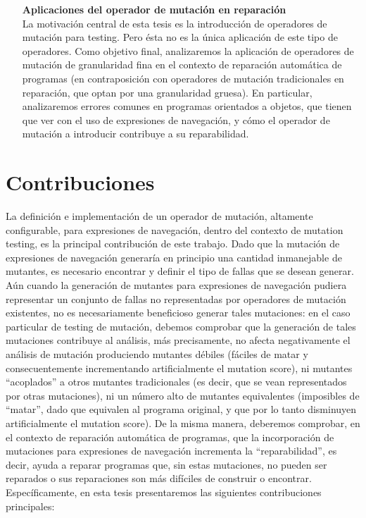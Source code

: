 \begin{enumerate}[leftmargin=.75cm,align=left,style=nextline]
    \item[\textbf{Aplicaciones del operador de mutaci\'on en reparaci\'on}]\mbox{}\\
	La motivaci\'on central de esta tesis es la introducci\'on de operadores de mutaci\'on para testing. Pero \'esta no es la \'unica aplicaci\'on de este tipo de operadores. Como objetivo final, analizaremos la aplicaci\'on de operadores de mutaci\'on de granularidad fina en el contexto de reparaci\'on autom\'atica de programas (en contraposici\'on con operadores de mutaci\'on tradicionales en reparaci\'on, que optan por una granularidad gruesa). En particular, analizaremos errores comunes en programas orientados a objetos, que tienen que ver con el uso de expresiones de navegaci\'on, y c\'omo el operador de mutaci\'on a introducir contribuye a su reparabilidad. 
\end{enumerate}


\section{Contribuciones}
\label{sec:intro.contribuciones}


La definici\'on e implementaci\'on de un operador de mutaci\'on, altamente configurable, para expresiones de navegaci\'on, dentro del contexto de mutation testing, es la principal contribuci\'on de este trabajo. Dado que la mutaci\'on de expresiones de navegaci\'on generar\'ia en principio una cantidad inmanejable de mutantes, es necesario encontrar y definir el tipo de fallas que se desean generar. A\'un cuando la generaci\'on de mutantes para expresiones de navegaci\'on pudiera representar un conjunto de fallas no representadas por operadores de mutaci\'on existentes, no es necesariamente beneficioso generar tales mutaciones: en el caso particular de testing de mutaci\'on, debemos comprobar que la generaci\'on de tales mutaciones contribuye al an\'alisis, m\'as precisamente, no afecta negativamente el an\'alisis de mutaci\'on produciendo mutantes d\'ebiles (f\'aciles de matar y consecuentemente incrementando artificialmente el mutation score), ni mutantes ``acoplados'' a otros mutantes tradicionales (es decir, que se vean representados por otras mutaciones), ni un n\'umero alto de mutantes equivalentes (imposibles de ``matar'', dado que equivalen al programa original, y que por lo tanto disminuyen artificialmente el mutation score). De la misma manera, deberemos comprobar, en el contexto de reparaci\'on autom\'atica de programas, que la incorporaci\'on de mutaciones para expresiones de navegaci\'on incrementa la ``reparabilidad'', es decir, ayuda a reparar programas que, sin estas mutaciones, no pueden ser reparados o sus reparaciones son m\'as dif\'iciles de construir o encontrar. Espec\'ificamente, en esta tesis presentaremos las siguientes contribuciones principales:

